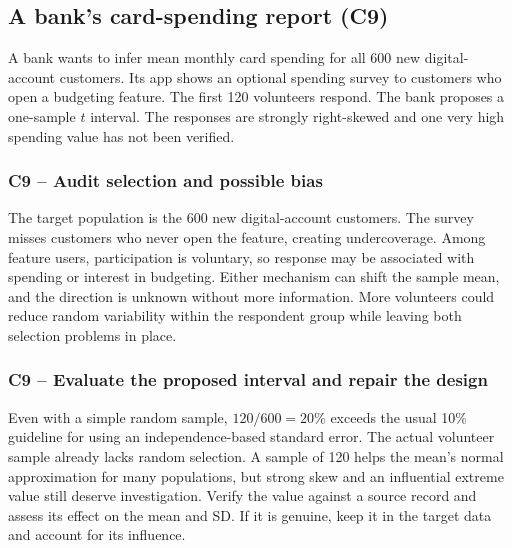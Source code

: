 	\subsection{A bank's card-spending report (C9)}
	\label{prob:c9-1}

	A bank wants to infer mean monthly card spending for all 600 new digital-account customers. Its app shows an optional spending survey to customers who open a budgeting feature. The first 120 volunteers respond. The bank proposes a one-sample $t$ interval. The responses are strongly right-skewed and one very high spending value has not been verified.


	\clearpage

	\label{sol:c9-1-a}
	\subsubsection*{C9 -- Audit selection and possible bias}

	The target population is the 600 new digital-account customers. The survey misses customers who never open the feature, creating undercoverage. Among feature users, participation is voluntary, so response may be associated with spending or interest in budgeting. Either mechanism can shift the sample mean, and the direction is unknown without more information. More volunteers could reduce random variability within the respondent group while leaving both selection problems in place.


	\label{sol:c9-1-b}
	\subsubsection*{C9 -- Evaluate the proposed interval and repair the design}

	Even with a simple random sample, $120/600=20\%$ exceeds the usual 10\% guideline for using an independence-based standard error. The actual volunteer sample already lacks random selection. A sample of 120 helps the mean's normal approximation for many populations, but strong skew and an influential extreme value still deserve investigation. Verify the value against a source record and assess its effect on the mean and SD. If it is genuine, keep it in the target data and account for its influence.

